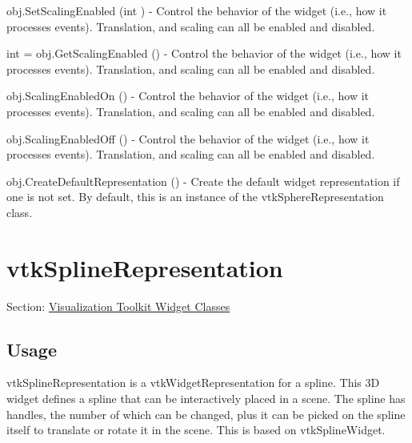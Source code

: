 \begin{DoxyItemize}
\item {\ttfamily obj.\-Set\-Scaling\-Enabled (int )} -\/ Control the behavior of the widget (i.\-e., how it processes events). Translation, and scaling can all be enabled and disabled.  
\item {\ttfamily int = obj.\-Get\-Scaling\-Enabled ()} -\/ Control the behavior of the widget (i.\-e., how it processes events). Translation, and scaling can all be enabled and disabled.  
\item {\ttfamily obj.\-Scaling\-Enabled\-On ()} -\/ Control the behavior of the widget (i.\-e., how it processes events). Translation, and scaling can all be enabled and disabled.  
\item {\ttfamily obj.\-Scaling\-Enabled\-Off ()} -\/ Control the behavior of the widget (i.\-e., how it processes events). Translation, and scaling can all be enabled and disabled.  
\item {\ttfamily obj.\-Create\-Default\-Representation ()} -\/ Create the default widget representation if one is not set. By default, this is an instance of the vtk\-Sphere\-Representation class.  
\end{DoxyItemize}\hypertarget{vtkwidgets_vtksplinerepresentation}{}\section{vtk\-Spline\-Representation}\label{vtkwidgets_vtksplinerepresentation}
Section\-: \hyperlink{sec_vtkwidgets}{Visualization Toolkit Widget Classes} \hypertarget{vtkwidgets_vtkxyplotwidget_Usage}{}\subsection{Usage}\label{vtkwidgets_vtkxyplotwidget_Usage}
vtk\-Spline\-Representation is a vtk\-Widget\-Representation for a spline. This 3\-D widget defines a spline that can be interactively placed in a scene. The spline has handles, the number of which can be changed, plus it can be picked on the spline itself to translate or rotate it in the scene. This is based on vtk\-Spline\-Widget.

